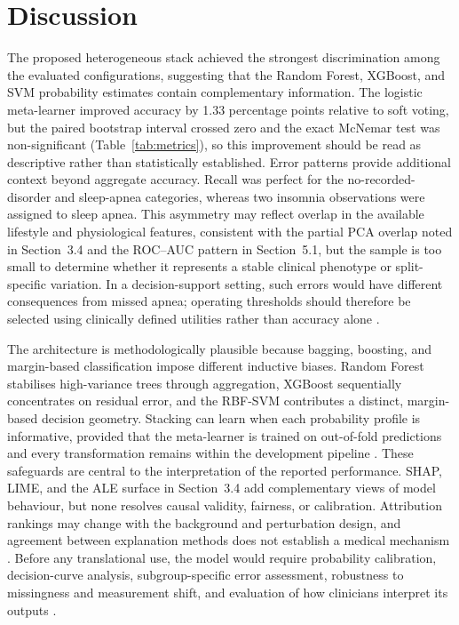 \documentclass{elektr}
\begin{document}
\section{Discussion}
The proposed heterogeneous stack achieved the strongest discrimination among the evaluated configurations, suggesting that the Random Forest, XGBoost, and SVM probability estimates contain complementary information. The logistic meta-learner improved accuracy by 1.33 percentage points relative to soft voting, but the paired bootstrap interval crossed zero and the exact McNemar test was non-significant (Table~\ref{tab:metrics}), so this improvement should be read as descriptive rather than statistically established. Error patterns provide additional context beyond aggregate accuracy. Recall was perfect for the no-recorded-disorder and sleep-apnea categories, whereas two insomnia observations were assigned to sleep apnea. This asymmetry may reflect overlap in the available lifestyle and physiological features, consistent with the partial PCA overlap noted in Section~3.4 and the ROC--AUC pattern in Section~5.1, but the sample is too small to determine whether it represents a stable clinical phenotype or split-specific variation. In a decision-support setting, such errors would have different consequences from missed apnea; operating thresholds should therefore be selected using clinically defined utilities rather than accuracy alone \cite{riley2024,futureai2025}.

The architecture is methodologically plausible because bagging, boosting, and margin-based classification impose different inductive biases. Random Forest stabilises high-variance trees through aggregation, XGBoost sequentially concentrates on residual error, and the RBF-SVM contributes a distinct, margin-based decision geometry. Stacking can learn when each probability profile is informative, provided that the meta-learner is trained on out-of-fold predictions and every transformation remains within the development pipeline \cite{borisov2024,kapoor2023}. These safeguards are central to the interpretation of the reported performance.
SHAP, LIME, and the ALE surface in Section~3.4 add complementary views of model behaviour, but none resolves causal validity, fairness, or calibration. Attribution rankings may change with the background and perturbation design, and agreement between explanation methods does not establish a medical mechanism \cite{instanceshap2023,jung2023,pesapane2026}. Before any translational use, the model would require probability calibration, decision-curve analysis, subgroup-specific error assessment, robustness to missingness and measurement shift, and evaluation of how clinicians interpret its outputs \cite{hu2024,tripodai2024,futureai2025}.
\end{document}
